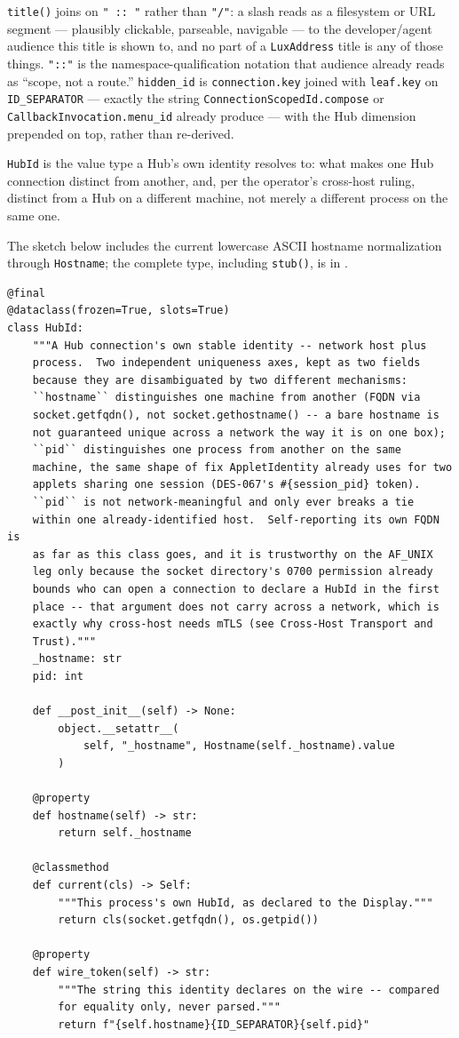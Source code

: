 \documentclass[a4paper,10pt]{article}
\newcommand{\modpath}[1]{\path{src/punt_lux/#1}}
\newcommand{\field}[1]{\texttt{#1}}
\begin{document}
\texttt{title()} joins on \texttt{" :: "} rather than \texttt{"/"}: a slash
reads as a filesystem or URL segment --- plausibly clickable, parseable,
navigable --- to the developer/agent audience this title is shown to, and
no part of a \texttt{LuxAddress} title is any of those things.
\texttt{"::"} is the namespace-qualification notation that audience already
reads as ``scope, not a route.''  \field{hidden\_id} is
\field{connection.key} joined with \field{leaf.key} on
\texttt{ID\_SEPARATOR} --- exactly the string
\texttt{ConnectionScopedId.compose} or \texttt{CallbackInvocation.menu\_id}
already produce --- with the Hub dimension prepended on top, rather than
re-derived.

\texttt{HubId} is the value type a Hub's own identity resolves to: what
makes one Hub connection distinct from another, and, per the operator's
cross-host ruling, distinct from a Hub on a different machine, not merely a
different process on the same one.

The sketch below includes the current lowercase ASCII hostname
normalization through \texttt{Hostname}; the complete type, including
\texttt{stub()}, is in \modpath{wire/model/hub_id.py}.

\begin{lstlisting}
@final
@dataclass(frozen=True, slots=True)
class HubId:
    """A Hub connection's own stable identity -- network host plus
    process.  Two independent uniqueness axes, kept as two fields
    because they are disambiguated by two different mechanisms:
    ``hostname`` distinguishes one machine from another (FQDN via
    socket.getfqdn(), not socket.gethostname() -- a bare hostname is
    not guaranteed unique across a network the way it is on one box);
    ``pid`` distinguishes one process from another on the same
    machine, the same shape of fix AppletIdentity already uses for two
    applets sharing one session (DES-067's #{session_pid} token).
    ``pid`` is not network-meaningful and only ever breaks a tie
    within one already-identified host.  Self-reporting its own FQDN is
    as far as this class goes, and it is trustworthy on the AF_UNIX
    leg only because the socket directory's 0700 permission already
    bounds who can open a connection to declare a HubId in the first
    place -- that argument does not carry across a network, which is
    exactly why cross-host needs mTLS (see Cross-Host Transport and
    Trust)."""
    _hostname: str
    pid: int

    def __post_init__(self) -> None:
        object.__setattr__(
            self, "_hostname", Hostname(self._hostname).value
        )

    @property
    def hostname(self) -> str:
        return self._hostname

    @classmethod
    def current(cls) -> Self:
        """This process's own HubId, as declared to the Display."""
        return cls(socket.getfqdn(), os.getpid())

    @property
    def wire_token(self) -> str:
        """The string this identity declares on the wire -- compared
        for equality only, never parsed."""
        return f"{self.hostname}{ID_SEPARATOR}{self.pid}"
\end{lstlisting}
\end{document}
